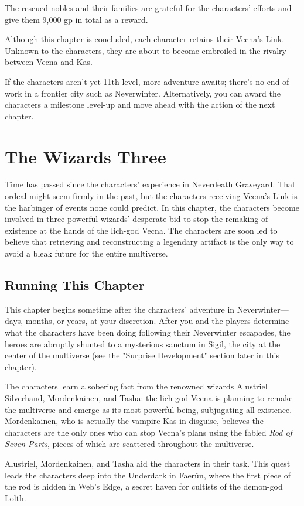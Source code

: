 \documentclass[10pt,a4paper,twoside,bg=print,twocolumn,openany,nodeprecatedcode]{dndbook}
\begin{document}
The rescued nobles and their families are grateful for the characters' efforts and give them 9,000 gp in total as a reward.

Although this chapter is concluded, each character retains their Vecna's Link. Unknown to the characters, they are about to become embroiled in the rivalry between Vecna and Kas.

If the characters aren't yet 11th level, more adventure awaits; there's no end of work in a frontier city such as Neverwinter. Alternatively, you can award the characters a milestone level-up and move ahead with the action of the next chapter.

\chapter{The Wizards Three}
Time has passed since the characters' experience in Neverdeath Graveyard. That ordeal might seem firmly in the past, but the characters receiving Vecna's Link is the harbinger of events none could predict. In this chapter, the characters become involved in three powerful wizards' desperate bid to stop the remaking of existence at the hands of the lich-god Vecna. The characters are soon led to believe that retrieving and reconstructing a legendary artifact is the only way to avoid a bleak future for the entire multiverse.

\section{Running This Chapter}
This chapter begins sometime after the characters' adventure in Neverwinter—days, months, or years, at your discretion. After you and the players determine what the characters have been doing following their Neverwinter escapades, the heroes are abruptly shunted to a mysterious sanctum in Sigil, the city at the center of the multiverse (see the "Surprise Development" section later in this chapter).

The characters learn a sobering fact from the renowned wizards Alustriel Silverhand, Mordenkainen, and Tasha: the lich-god Vecna is planning to remake the multiverse and emerge as its most powerful being, subjugating all existence. Mordenkainen, who is actually the vampire Kas in disguise, believes the characters are the only ones who can stop Vecna's plans using the fabled \textit{Rod of Seven Parts}, pieces of which are scattered throughout the multiverse.

Alustriel, Mordenkainen, and Tasha aid the characters in their task. This quest leads the characters deep into the Underdark in Faerûn, where the first piece of the rod is hidden in Web's Edge, a secret haven for cultists of the demon-god Lolth.
\end{document}
